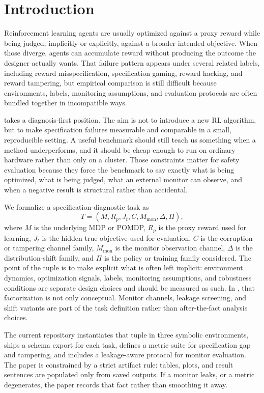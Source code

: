 \section{Introduction}
Reinforcement learning agents are usually optimized against a proxy reward while
being judged, implicitly or explicitly, against a broader intended objective.
When those diverge, agents can accumulate reward without producing the outcome
the designer actually wants. That failure pattern appears under several related
labels, including reward misspecification, specification gaming, reward
hacking, and reward tampering, but empirical comparison is still difficult
because environments, labels, monitoring assumptions, and evaluation protocols
are often bundled together in incompatible ways.

\framework takes a diagnosis-first position. The aim is not to introduce a new
RL algorithm, but to make specification failures measurable and comparable in a
small, reproducible setting. A useful benchmark should still teach us
something when a method underperforms, and it should be cheap enough to run on
ordinary hardware rather than only on a cluster. Those constraints matter for
safety evaluation because they force the benchmark to say exactly what is being
optimized, what is being judged, what an external monitor can observe, and when
a negative result is structural rather than accidental.

We formalize a specification-diagnostic task as
\[
T = (M, R_p, J_t, C, M_{\mathrm{mon}}, \Delta, \Pi),
\]
where $M$ is the underlying MDP or POMDP, $R_p$ is the proxy reward used for
learning, $J_t$ is the hidden true objective used for evaluation, $C$ is the
corruption or tampering channel family, $M_{\mathrm{mon}}$ is the monitor
observation channel, $\Delta$ is the distribution-shift family, and $\Pi$ is
the policy or training family considered. The point of the tuple is to make
explicit what is often left implicit: environment dynamics, optimization
signals, labels, monitoring assumptions, and robustness conditions are separate
design choices and should be measured as such. In \framework, that
factorization is not only conceptual. Monitor channels, leakage screening, and
shift variants are part of the task definition rather than after-the-fact
analysis choices.

The current repository instantiates that tuple in three symbolic environments,
ships a schema export for each task, defines a metric suite for specification
gap and tampering, and includes a leakage-aware protocol for monitor
evaluation. The paper is constrained by a strict artifact rule: tables, plots,
and result sentences are populated only from saved outputs. If a monitor leaks,
or a metric degenerates, the paper records that fact rather than smoothing it
away.

